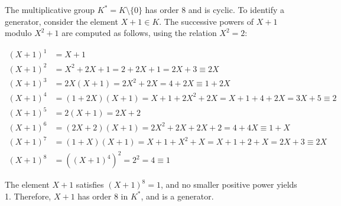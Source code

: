 \documentclass[12pt]{article}
\begin{document}
The multiplicative group \( K^* = K \setminus \{0\} \) has order 8 and is cyclic. To identify a generator, consider the element \( X + 1 \in K \). The successive powers of \( X + 1 \) modulo \( X^2 + 1 \) are computed as follows, using the relation \( X^2 = 2 \):

\[
\begin{aligned}
(X + 1)^1 &= X + 1 \\
(X + 1)^2 &= X^2 + 2X + 1 = 2 + 2X + 1 = 2X + 3 \equiv 2X \\
(X + 1)^3 &= 2X(X + 1) = 2X^2 + 2X = 4 + 2X \equiv 1 + 2X \\
(X + 1)^4 &= (1 + 2X)(X + 1) = X + 1 + 2X^2 + 2X = X + 1 + 4 + 2X = 3X + 5 \equiv 2 \\
(X + 1)^5 &= 2(X + 1) = 2X + 2 \\
(X + 1)^6 &= (2X + 2)(X + 1) = 2X^2 + 2X + 2X + 2 = 4 + 4X \equiv 1 + X \\
(X + 1)^7 &= (1 + X)(X + 1) = X + 1 + X^2 + X = X + 1 + 2 + X = 2X + 3 \equiv 2X \\
(X + 1)^8 &= ((X + 1)^4)^2 = 2^2 = 4 \equiv 1
\end{aligned}
\]

The element \( X + 1 \) satisfies \( (X + 1)^8 = 1 \), and no smaller positive power yields 1. Therefore, \( X + 1 \) has order 8 in \( K^* \), and is a generator.
\end{document}
